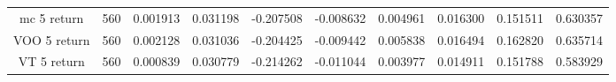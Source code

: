 \begin{appendices}
\begin{table}[ht]
\begin{adjustbox}{width=\textwidth}
\begin{tabular}{@{}clllllllll@{}}
    mc 5 return            & 560                                & 0.001913                          & 0.031198                         & -0.207508                        & -0.008632                         & 0.004961                          & 0.016300                          & 0.151511                         & 0.630357                                      \\
    VOO 5 return           & 560                                & 0.002128                          & 0.031036                         & -0.204425                        & -0.009442                         & 0.005838                          & 0.016494                          & 0.162820                         & 0.635714                                      \\
    VT 5 return            & 560                                & 0.000839                          & 0.030779                         & -0.214262                        & -0.011044                         & 0.003977                          & 0.014911                          & 0.151788                         & 0.583929                                      \\ \bottomrule
\end{tabular}
\end{adjustbox}
\label{tab:st_returns_stats_all}
\end{table}


\end{appendices}
